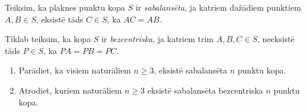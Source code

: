 \begin{problem}
Teiksim, ka plaknes punktu kopa $S$ ir \emph{sabalansēta}, ja katriem dažādiem punktiem $A,B \in S $, eksistē tāds $C \in S$, ka $AC=AB$.

Tiklab teiksim, ka kopa $S$ ir \emph{bezcentriska}, ja katriem trim $A,B,C \in S$, neeksistē tāds $P \in S$, ka $PA=PB=PC$.
\begin{enumerate}
\item Parādiet, ka visiem naturāliem $n\geq 3$, eksistē sabalansēta $n$ punktu kopa.
\item Atrodiet, kuriem naturāliem $n\geq 3$ eksistē sabalansēta bezcentriska $n$ punktu kopa.
\end{enumerate}

\end{problem}

%

